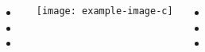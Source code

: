 \documentclass[
25pt,
a0paper, 
portrait,
blockverticalspace=.1em,
margin=.5in,
innermargin=0mm
]{tikzposter}
\begin{document}
		\maketitle
		
		{
			
		}
		
	{

		\begin{columns}
				\begin{minipage}[c]{0.3\linewidth}
					
					\begin{itemize}
						\item 
						\lipsum[1]
						\item 
						\lipsum[2]
						\item 
						\lipsum[3]
					\end{itemize}
					
				\end{minipage}
				\begin{minipage}[c]{0.3\linewidth}
				
				
				\begin{tikzfigure}[Caption]
					\texttt{[image: example-image-c]}
					\label{fig:methodsfigure1}
				\end{tikzfigure}
				
				\end{minipage}
				\begin{minipage}[c]{0.3\linewidth}

				\begin{itemize}
					\item 
					\lipsum[1]
					\item 
					\lipsum[2]
					\item 
					\lipsum[3]
				\end{itemize}

			\end{minipage}
	\end{columns}

	}
\end{document}
